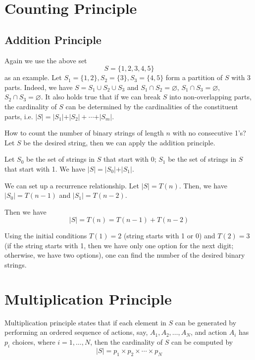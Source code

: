 \section{Counting Principle}
\subsection{Addition Principle}
Again we use the above set 
\[
    S = \{1, 2, 3, 4, 5\}
\]
as an example. Let \(S_1 = \{1, 2\}, S_2 = \{3\}, S_3 = \{4, 5\}\) form a partition of \(S\) with 3 parts. Indeed, we have \(S = S_1 \cup S_2 \cup S_3\) and \(S_1 \cap S_2 = \varnothing\), \(S_1 \cap S_3 = \varnothing\), \(S_2 \cap S_3 = \varnothing\).
It also holds true that if we can break \(S\) into non-overlapping parts, the cardinality of \(S\) can be determined by the cardinalities of the constituent parts, i.e. \(\vert S \vert = \vert S_1 \vert + \vert S_2 \vert + \cdots + \vert S_m \vert \).

\begin{eg}
    How to count the number of binary strings of length \(n\) with no consecutive 1's? Let \(S\) be the desired string, then we can apply the addition principle.

    Let \(S_0\) be the set of strings in \(S\) that start with 0; \(S_1\) be the set of strings in \(S\) that start with 1. We have \(\vert S \vert = \vert S_0 \vert + \vert S_1 \vert\).

    We can set up a recurrence relationship. Let \(\vert S \vert = T(n)\). Then, we have \(\vert S_0 \vert = T(n - 1)\) and \(\vert S_1 \vert = T(n - 2)\).

    Then we have 
    \[
        \vert S \vert = T(n) = T(n - 1) + T(n - 2)
    \]

    Using the initial conditions \(T(1) = 2\) (string starts with 1 or 0) and \(T(2) = 3\) (if the string starts with 1, then we have only one option for the next digit; otherwise, we have two options), one can find the number of the desired binary strings. 
\end{eg}

\section{Multiplication Principle}
Multiplication principle states that if each element in \(S\) can be generated by performing an ordered sequence of actions, say, \(A_1, A_2, \dots, A_N\), and action \(A_i\) has \(p_i\) choices, where \(i = 1, \dots, N\), then the cardinality of \(S\) can be computed by
\[
    \vert S \vert = p_1 \times p_2 \times \cdots \times p_N
\] 

